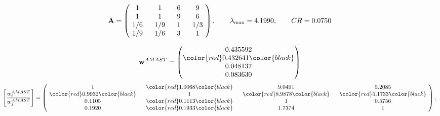 \begin{example}
\begin{equation*}
\mathbf{A} =
\begin{pmatrix}
$\,\,$ 1 $\,\,$ & $\,\,$1$\,\,$ & $\,\,$6$\,\,$ & $\,\,$9 $\,\,$ \\
$\,\,$ 1 $\,\,$ & $\,\,$ 1 $\,\,$ & $\,\,$9$\,\,$ & $\,\,$6 $\,\,$ \\
$\,\,$ 1/6$\,\,$ & $\,\,$ 1/9$\,\,$ & $\,\,$ 1 $\,\,$ & $\,\,$ 1/3 $\,\,$ \\
$\,\,$ 1/9$\,\,$ & $\,\,$ 1/6$\,\,$ & $\,\,$3$\,\,$ & $\,\,$ 1  $\,\,$ \\
\end{pmatrix},
\qquad
\lambda_{\max} =
4.1990,
\qquad
CR = 0.0750
\end{equation*}

\begin{equation*}
\mathbf{w}^{AMAST} =
\begin{pmatrix}
0.435592\\
\color{red} 0.432641\color{black} \\
0.048137\\
0.083630
\end{pmatrix}\end{equation*}
\begin{equation*}
\left[ \frac{{w}^{AMAST}_i}{{w}^{AMAST}_j} \right] =
\begin{pmatrix}
$\,\,$ 1 $\,\,$ & $\,\,$\color{red} 1.0068\color{black} $\,\,$ & $\,\,$9.0491$\,\,$ & $\,\,$5.2085$\,\,$ \\
$\,\,$\color{red} 0.9932\color{black} $\,\,$ & $\,\,$ 1 $\,\,$ & $\,\,$\color{red} 8.9878\color{black} $\,\,$ & $\,\,$\color{red} 5.1733\color{black}   $\,\,$ \\
$\,\,$0.1105$\,\,$ & $\,\,$\color{red} 0.1113\color{black} $\,\,$ & $\,\,$ 1 $\,\,$ & $\,\,$0.5756 $\,\,$ \\
$\,\,$0.1920$\,\,$ & $\,\,$\color{red} 0.1933\color{black} $\,\,$ & $\,\,$1.7374$\,\,$ & $\,\,$ 1  $\,\,$ \\
\end{pmatrix},
\end{equation*}


\end{example}
